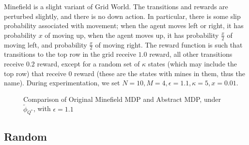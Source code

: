 \documentclass{article}
\newcommand{\ep}{\widetilde \phi}
\newcommand{\epQ}{\ep_{Q^*}}
\begin{document}
Minefield is a slight variant of Grid World. The transitions and rewards are perturbed slightly, and there is no down action. In particular, there is some slip probability associated with movement; when the agent moves left or right, it has probability $x$ of moving up, when the agent moves up, it has probability $\frac{x}{2}$ of moving left, and probability $\frac{x}{2}$ of moving right. The reward function is such that transitions to the top row in the grid receive $1.0$ reward, all other transitions receive $0.2$ reward, except for a random set of $\kappa$ states (which may include the top row) that receive $0$ reward (these are the states with mines in them, thus the name). During experimentation, we set $N=10, M=4, \epsilon=1.1, \kappa = 5, x = 0.01$.

\begin{figure}
\label{fig:minefield-visual}
\caption{Comparison of Original Minefield MDP and Abstract MDP, under $\epQ$, with $\epsilon=1.1$}
\end{figure} 


\subsection{Random}
\end{document}
